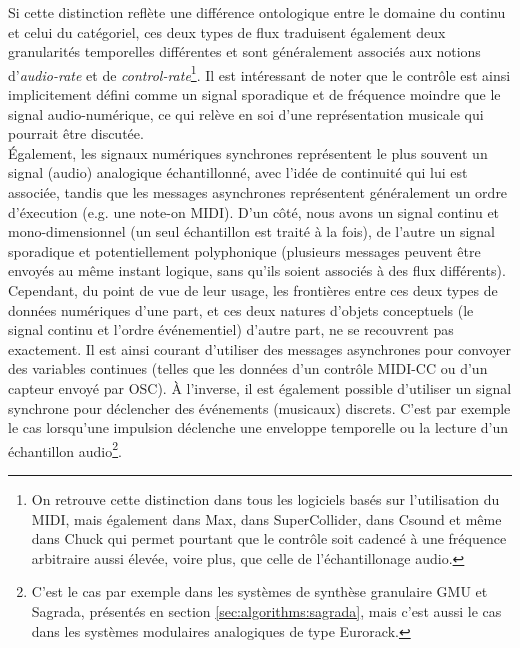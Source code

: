 \noindent Si cette distinction reflète une différence ontologique entre le domaine du continu et celui du catégoriel, ces deux types de flux traduisent également deux granularités temporelles différentes et sont généralement associés aux notions d'\textit{audio-rate} et de \textit{control-rate}\footnote{On retrouve cette distinction dans tous les logiciels basés sur l'utilisation du \gls{MIDI}, mais également dans Max, dans SuperCollider, dans Csound et même dans Chuck qui permet pourtant que le contrôle soit cadencé à une fréquence arbitraire aussi élevée, voire plus, que celle de l'échantillonage audio.}. Il est intéressant de noter que le contrôle est ainsi implicitement défini comme un signal sporadique et de fréquence moindre que le signal audio-numérique, ce qui relève en soi d'une représentation musicale qui pourrait être discutée.\\
\indent Également, les signaux numériques synchrones représentent le plus souvent un signal (audio) analogique échantillonné, avec l'idée de continuité qui lui est associée, tandis que les messages asynchrones représentent généralement un ordre d'éxecution (e.g. une note-on \gls{MIDI}). D'un côté, nous avons un signal continu et mono-dimensionnel (un seul échantillon est traité à la fois), de l'autre un signal sporadique et potentiellement polyphonique (plusieurs messages peuvent être envoyés au même instant logique, sans qu'ils soient associés à des flux différents).\\
\indent Cependant, du point de vue de leur usage, les frontières entre ces deux types de données numériques d'une part, et ces deux natures d'objets conceptuels (le signal continu et l'ordre événementiel) d'autre part, ne se recouvrent pas exactement. Il est ainsi courant d'utiliser des messages asynchrones pour convoyer des variables continues (telles que les données d'un contrôle MIDI-CC ou d'un capteur envoyé par \gls{OSC}). À l'inverse, il est également possible d'utiliser un signal synchrone pour déclencher des événements (musicaux) discrets. C'est par exemple le cas lorsqu'une impulsion déclenche une enveloppe temporelle ou la lecture d'un échantillon audio\footnote{C'est le cas par exemple dans les systèmes de synthèse granulaire \gls{GMU} et Sagrada, présentés en section \ref{sec:algorithms:sagrada}, mais c'est aussi le cas dans les systèmes modulaires analogiques de type Eurorack.}.

